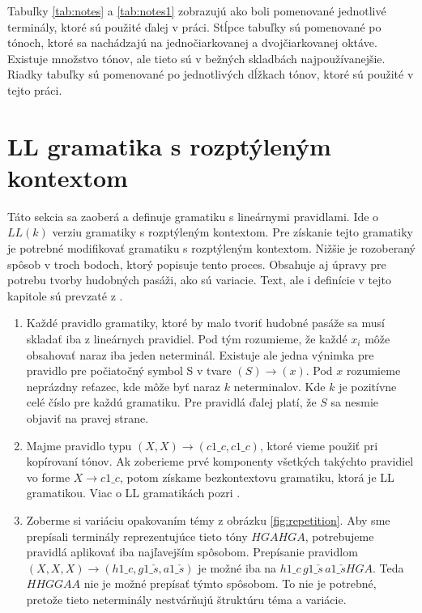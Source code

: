 Tabuľky \ref{tab:notes} a \ref{tab:notes1} zobrazujú ako boli pomenované jednotlivé terminály, ktoré sú použité ďalej v práci. Stĺpce tabuľky sú pomenované po tónoch, ktoré sa nachádzajú na jednočiarkovanej a dvojčiarkovanej oktáve. Existuje množstvo tónov, ale tieto sú v bežných skladbách najpoužívanejšie. Riadky tabuľky sú pomenované po jednotlivých dĺžkach tónov, ktoré sú použité v tejto práci.

\section{LL gramatika s rozptýleným kontextom}
Táto sekcia sa zaoberá a definuje gramatiku s lineárnymi pravidlami. Ide o $LL(k)$ verziu gramatiky s rozptýleným kontextom. Pre získanie tejto gramatiky je potrebné modifikovať gramatiku s rozptýleným kontextom. Nižšie je rozoberaný spôsob v troch bodoch, ktorý popisuje tento proces. Obsahuje aj úpravy pre potrebu tvorby hudobných pasáži, ako sú variacie. Text, ale i definície v tejto kapitole sú prevzaté z \cite{FITPUB10498}.

\begin{enumerate}[label=\arabic*)]
    \item Každé pravidlo gramatiky, ktoré by malo tvoriť hudobné pasáže sa musí skladať iba z lineárnych pravidiel. Pod tým rozumieme, že každé $x_i$ môže obsahovať naraz iba jeden neterminál. Existuje ale jedna výnimka pre pravidlo pre počiatočný symbol S v tvare $(S) \rightarrow (x)$. Pod $x$ rozumieme neprázdny reťazec, kde môže byť naraz $k$ neterminalov. Kde $k$ je pozitívne celé číslo pre každú gramatiku. Pre pravidlá ďalej platí, že $S$ sa nesmie objaviť na pravej strane.
    
    \item Majme pravidlo typu $(X,X) \rightarrow (c1\_c, c1\_c)$, ktoré vieme použiť pri kopírovaní tónov. Ak zoberieme prvé komponenty všetkých takýchto pravidiel vo forme $X \rightarrow c1\_c$, potom získame bezkontextovu gramatiku, ktorá je LL gramatikou. Viac o LL gramatikách pozri \cite{FITPUB10524}.
    
    \item Zoberme si variáciu opakovaním témy z obrázku \ref{fig:repetition}. Aby sme prepísali terminály reprezentujúce tieto tóny $HGAHGA$, potrebujeme pravidlá aplikovať iba najľavejším spôsobom. Prepísanie pravidlom $(X,X,X) \rightarrow (h1\_c, g1\_\check{s}, a1\_\check{s})$ je možné iba na $h1\_c \, g1\_\check{s} \, a1\_\check{s}HGA$. Teda $HHGGAA$ nie je možné prepísať týmto spôsobom. To nie je potrebné, pretože tieto neterminály nestvárňujú štruktúru téma a variácie.
\end{enumerate}

